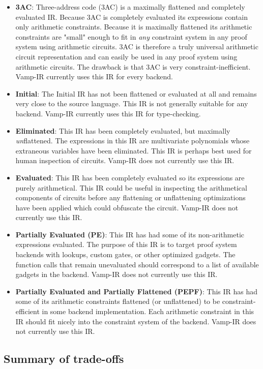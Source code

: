 \documentclass[
    9pt,            %
    techreport,        %
    affiltop,       %
]{art}
\begin{document}
\begin{itemize}
\item \textbf{3AC}: Three-address code (3AC) is a maximally flattened and completely evaluated IR. Because 3AC is completely evaluated its expressions contain only arithmetic constraints. Because it is maximally flattened its arithmetic constraints are "small" enough to fit in \emph{any} constraint system in any proof system using arithmetic circuits. 3AC is therefore a truly universal arithmetic circuit representation and can easily be used in any proof system using arithmetic circuits. The drawback is that 3AC is very constraint-inefficient. Vamp-IR currently uses this IR for every backend.
\item \textbf{Initial}: The Initial IR has not been flattened or evaluated at all and remains very close to the source language. This IR is not generally suitable for any backend. Vamp-IR currently uses this IR for type-checking.
\item \textbf{Eliminated}: This IR has been completely evaluated, but maximally \emph{un}flattened. The expressions in this IR are multivariate polynomials whose extraneous variables have been eliminated. This IR is perhaps best used for human inspection of circuits. Vamp-IR does not currently use this IR.
\item \textbf{Evaluated}: This IR has been completely evaluated so its expressions are purely arithmetical. This IR could be useful in inspecting the arithmetical components of circuits before any flattening or unflattening optimizations have been applied which could obfuscate the circuit. Vamp-IR does not currently use this IR.
\item \textbf{Partially Evaluated (PE)}: This IR has had some of its non-arithmetic expressions evaluated. The purpose of this IR is to target proof system backends with lookups, custom gates, or other optimized gadgets. The function calls that remain unevaluated should correspond to a list of available gadgets in the backend. Vamp-IR does not currently use this IR.
\item \textbf{Partially Evaluated and Partially Flattened (PEPF)}: This IR has had some of its arithmetic constraints flattened (or unflattened) to be constraint-efficient in some backend implementation. Each arithmetic constraint in this IR should fit nicely into the constraint system of the backend. Vamp-IR does not currently use this IR.
\end{itemize}

\subsection{Summary of trade-offs}\hfill\\
\end{document}
